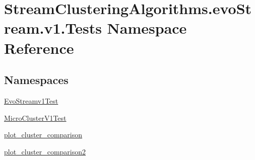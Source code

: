\hypertarget{namespaceStreamClusteringAlgorithms_1_1evoStream_1_1v1_1_1Tests}{}\section{Stream\+Clustering\+Algorithms.\+evo\+Stream.\+v1.\+Tests Namespace Reference}
\label{namespaceStreamClusteringAlgorithms_1_1evoStream_1_1v1_1_1Tests}
\subsection*{Namespaces}
\begin{DoxyCompactItemize}
\item 
 \hyperlink{namespaceStreamClusteringAlgorithms_1_1evoStream_1_1v1_1_1Tests_1_1EvoStreamv1Test}{Evo\+Streamv1\+Test}
\item 
 \hyperlink{namespaceStreamClusteringAlgorithms_1_1evoStream_1_1v1_1_1Tests_1_1MicroClusterV1Test}{Micro\+Cluster\+V1\+Test}
\item 
 \hyperlink{namespaceStreamClusteringAlgorithms_1_1evoStream_1_1v1_1_1Tests_1_1plot__cluster__comparison}{plot\+\_\+cluster\+\_\+comparison}
\item 
 \hyperlink{namespaceStreamClusteringAlgorithms_1_1evoStream_1_1v1_1_1Tests_1_1plot__cluster__comparison2}{plot\+\_\+cluster\+\_\+comparison2}
\end{DoxyCompactItemize}
